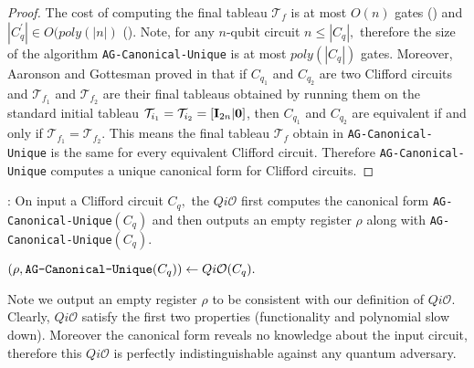 \begin{proof}
The cost of computing the final tableau $\mathcal{T}_f$ is at most $O(n)$ gates (\cite{AG04}) and $|C_q^\prime |\in O(poly(|n|)$ (\cite{AG04}).  Note, for any $n$-qubit circuit $n\leq |C_q|,$ therefore the size of the algorithm {\tt AG-Canonical-Unique} is at most $poly(|C_q|)$ gates. Moreover, Aaronson and Gottesman proved in \cite{AG04} that if $C_{q_1}$ and $C_{q_2}$ are two Clifford circuits and $\mathcal{T}_{f_1}$ and $\mathcal{T}_{f_2}$ are their final tableaus obtained by running them on the standard initial tableau
$\mathcal{T}_{i_1}=\mathcal{T}_{i_2}=[{\bf I}_{2n}|{\bf 0}]$, then $C_{q_1}$ and $C_{q_2}$ are equivalent if and only if $\mathcal{T}_{f_1}=\mathcal{T}_{f_2}.$ This means the final tableau $\mathcal{T}_f$ obtain in {\tt AG-Canonical-Unique} is the same for every equivalent Clifford circuit. Therefore {\tt AG-Canonical-Unique} computes a unique canonical form for Clifford circuits.
\end{proof}


:  On input a Clifford circuit $C_q,$ the $Qi\mathcal{O}$ first computes the canonical form  {\tt AG-Canonical-Unique}$(C_q)$ and then outputs an empty register $\rho$ along with {\tt AG-Canonical-Unique}$(C_q).$

\begin{center}
$(\rho, \mbox{{\tt AG-Canonical-Unique}}(C_q))\leftarrow Qi\mathcal{O}(C_q).$
\end{center}
Note we output an empty register $\rho$ to be consistent with our definition of  $Qi\mathcal{O}.$ Clearly, $Qi\mathcal{O}$ satisfy the first two properties (functionality and polynomial slow down). Moreover the canonical form reveals no knowledge about the input circuit, therefore this $Qi\mathcal{O}$ is perfectly indistinguishable against any quantum adversary.

